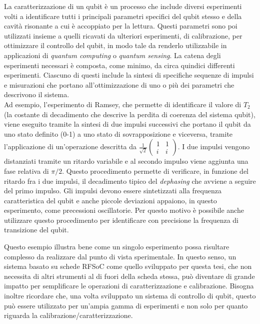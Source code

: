 \documentclass{article}
\begin{document}
La caratterizzazione di un qubit è un processo che include diversi esperimenti volti a identificare tutti i principali parametri specifici del qubit stesso e della cavità risonante a cui è accoppiato per la lettura.
%
Questi parametri sono poi utilizzati insieme a quelli ricavati da ulteriori esperimenti, di calibrazione, per ottimizzare il controllo del qubit, in modo tale da renderlo utilizzabile in applicazioni di \textit{quantum computing} o \textit{quantum sensing}.
%
La catena degli esperimenti necessari è composta, come minimo, da circa quindici differenti esperimenti. 
Ciascuno di questi include la sintesi di specifiche sequenze di impulsi e misurazioni che portano all'ottimizzazione di uno o più dei parametri che descrivono il sistema.\\
Ad esempio, l'esperimento di Ramsey, che permette di identificare il valore di $T_2$ (la costante di decadimento che descrive la perdita di coerenza del sistema qubit), viene eseguito tramite la sintesi di due impulsi successivi che portano il qubit da uno stato definito (0-1) a uno stato di sovrapposizione e viceversa, tramite l'applicazione di un'operazione descritta da $\frac{1}{\sqrt{2}}\begin{pmatrix}1 & 1 \\ i & i \end{pmatrix}$. I due impulsi vengono distanziati tramite un ritardo variabile e al secondo impulso viene aggiunta una fase relativa di $\pi/2$. 
%
Questo procedimento permette di verificare, in funzione del ritardo fra i due impulsi, il decadimento tipico del \textit{dephasing} che avviene a seguire del primo impulso.
Gli impulsi devono essere sintetizzati alla frequenza caratteristica del qubit e anche piccole deviazioni appaiono, in questo esperimento, come precessioni oscillatorie. Per questo motivo è possibile anche utilizzare questo procedimento per identificare con precisione la frequenza di transizione del qubit.

Questo esempio illustra bene come un singolo esperimento possa risultare complesso da realizzare dal punto di vista sperimentale. 
In questo senso, un sistema basato su schede RFSoC come quello sviluppato per questa tesi, che non necessita di altri strumenti al di fuori della scheda stessa, può diventare di grande impatto per semplificare le operazioni di caratterizzazione e calibrazione.
Bisogna inoltre ricordare che, una volta sviluppato un sistema di controllo di qubit, questo può essere utilizzato per un'ampia gamma di esperimenti e non solo per quanto riguarda la calibrazione/caratterizzazione.
\end{document}
